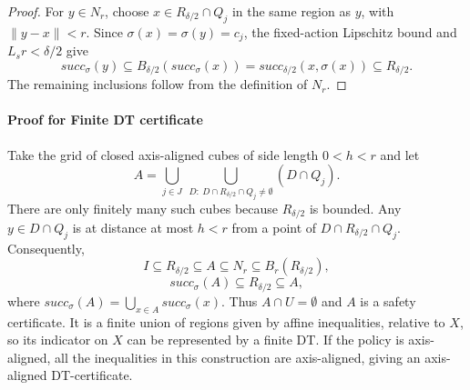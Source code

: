 \documentclass[runningheads]{llncs}
\newcommand{\ReLU}{\mathrm{ReLU}}
\begin{document}
\begin{proof}
For $y\in N_r$, choose $x\in R_{\delta/2}\cap Q_j$ in the same region as $y$, with $\|y-x\|<r$.
Since $\sigma(x)=\sigma(y)=c_j$, the fixed-action Lipschitz bound and $L_s r<\delta/2$ give
\[
succ_\sigma(y)
\subseteq B_{\delta/2}(succ_\sigma(x))
=succ_{\delta/2}(x,\sigma(x))
\subseteq R_{\delta/2}.
\]
The remaining inclusions follow from the definition of $N_r$.
\end{proof}

{\color{red} \paragraph{Proof for Finite DT certificate}
Take the grid of closed axis-aligned cubes of side length $0<h<r$ and let
\[
A=\bigcup_{j\in J}\ \bigcup_{D:\ D\cap R_{\delta/2}\cap Q_j\ne\emptyset}(D\cap Q_j).
\]
There are only finitely many such cubes because $R_{\delta/2}$ is bounded.
Any $y\in D\cap Q_j$ is at distance at most $h<r$ from a point of $D\cap R_{\delta/2}\cap Q_j$.
Consequently,
\[
I\subseteq R_{\delta/2}\subseteq A\subseteq N_r\subseteq B_r(R_{\delta/2}),
\]
\[
succ_\sigma(A)\subseteq R_{\delta/2}\subseteq A,
\]
where $succ_\sigma(A)=\bigcup_{x\in A}succ_\sigma(x)$.
Thus $A\cap U=\emptyset$ and $A$ is a safety certificate.
It is a finite union of regions given by affine inequalities, relative to $X$, so its indicator on $X$ can be represented by a finite DT.
If the policy is axis-aligned, all the inequalities in this construction are axis-aligned, giving an axis-aligned DT-certificate.}



\end{document}
